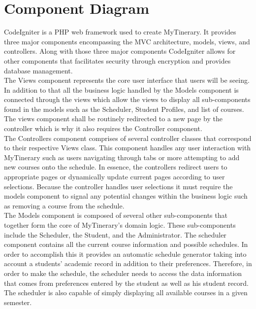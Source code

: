 \documentclass{article}
\begin{document}
\section{Component Diagram}

CodeIgniter is a PHP web framework used to create MyTinerary. It provides three major components encompassing the MVC architecture, models, views, and controllers. Along with those three major components CodeIgniter allows for other components that facilitates security through encryption and provides database management.\\

The Views component represents the core user interface that users will be seeing. In addition to that all the business logic handled by the Models component is connected through the views which allow the views to display all sub-components found in the models such as the Scheduler, Student Profiles, and list of courses.  The views component shall be routinely redirected to a new page by the controller which is why it also requires the Controller component.\\

The Controllers component comprises of several controller classes that correspond to their respective Views class. This component handles any user interaction with MyTinerary such as users navigating through tabs or more attempting to add new courses onto the schedule. In essence, the controllers redirect users to appropriate pages or dynamically update current pages according to user selections. Because the controller handles user selections it must require the models component to signal any potential changes within the business logic such as removing a course from the schedule.\\
 
The Models component is composed of several other sub-components that together form the core of MyTinerary’s domain logic. These sub-components include the Scheduler, the Student, and the Administrator. The scheduler component contains all the current course information and possible schedules. In order to accomplish this it provides an automatic schedule generator taking into account a students’ academic record in addition to their preferences. Therefore, in order to make the schedule, the scheduler needs to access the data information that comes from preferences entered by the student as well as his student record. The scheduler is also capable of simply displaying all available courses in a given semester.  \\
\end{document}
